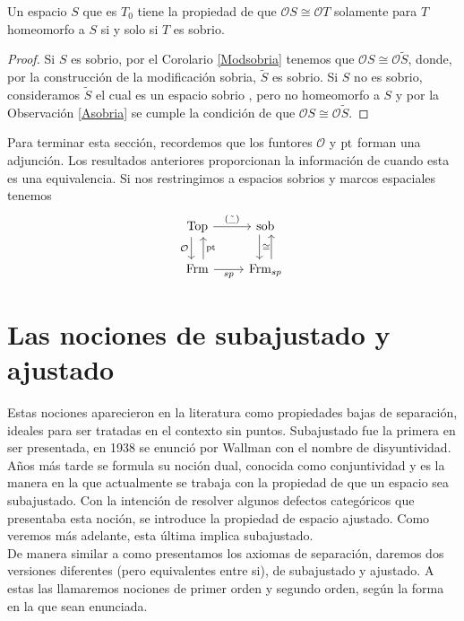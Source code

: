\begin{prop}
    Un espacio $S$ que es $T_0$ tiene la propiedad de que $\mathcal{O}S\cong \mathcal{O}T$ solamente para $T$ homeomorfo a $S$ si y solo si $T$ es sobrio.
\end{prop}

\begin{proof}
    Si $S$ es sobrio, por el Corolario \ref{Modsobria} tenemos que $\mathcal{O}S\cong \mathcal{O}\tilde{S}$, donde, por la construcción de la modificación sobria, $\tilde{S}$ es sobrio. Si $S$ no es sobrio, consideramos $\tilde{S}$ el cual es un espacio sobrio , pero no homeomorfo a $S$ y por la Observación \ref{Asobria} se cumple la condición de que $\mathcal{O}S\cong \mathcal{O}\tilde{S}$.
\end{proof}

Para terminar esta sección, recordemos que los funtores $\mathcal{O}$ y $\mathrm{pt}$ forman una adjunción. Los resultados anteriores proporcionan la información de cuando esta es una equivalencia. Si nos restringimos a espacios sobrios y marcos espaciales tenemos 
\[\begin{tikzcd}
	\Top & \sob \\
	\Frm & {\Frm_{sp}}
	\arrow["{\mathcal{O}}"', shift right=2, from=1-1, to=2-1]
	\arrow["\pt"', shift right=2, from=2-1, to=1-1]
	\arrow["{(\tilde{\_})}", from=1-1, to=1-2]
	\arrow["sp"', from=2-1, to=2-2]
	\arrow["\cong", shift right=2, from=1-2, to=2-2]
	\arrow[shift right=2, from=2-2, to=1-2]
\end{tikzcd}\]

\section{Las nociones de subajustado y ajustado}

Estas nociones aparecieron en la literatura como propiedades bajas de separación, ideales para ser tratadas en el contexto sin puntos. Subajustado fue la primera en ser presentada, en 1938 se enunció por Wallman con el nombre de disyuntividad. Años más tarde se formula su noción dual, conocida como conjuntividad y es la manera en la que actualmente se trabaja con la propiedad de que un espacio sea subajustado. Con la intención de resolver algunos defectos categóricos que presentaba esta noción, se introduce la propiedad de espacio ajustado. Como veremos más adelante, esta última implica subajustado.\\

De manera similar a como presentamos los axiomas de separación, daremos dos versiones diferentes (pero equivalentes entre si), de subajustado y ajustado. A estas las llamaremos nociones de primer orden y segundo orden, según la forma en la que sean enunciada. 

